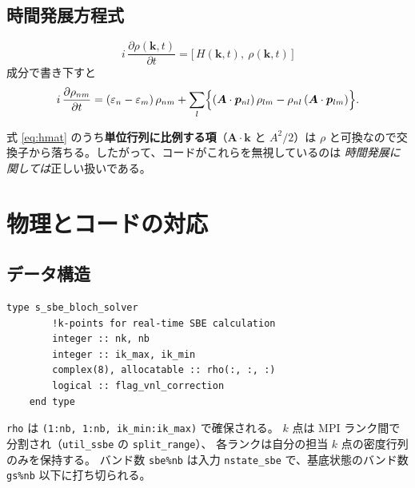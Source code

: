 \documentclass[dvipdfmx,a4paper,11pt]{jsarticle}
\newcommand{\file}[1]{\texttt{#1}}
\newcommand{\vk}{\bm{k}}
\newcommand{\vA}{\bm{A}}
\newcommand{\vp}{\bm{p}}
\newcommand{\eps}{\varepsilon}
\begin{document}
\subsection{時間発展方程式}

\begin{equation}
  i\,\frac{\partial \rho(\vk,t)}{\partial t} = \bigl[\, H(\vk,t),\ \rho(\vk,t) \,\bigr]
  \label{eq:vn}
\end{equation}
%
成分で書き下すと
%
\begin{equation}
  i\,\frac{\partial \rho_{nm}}{\partial t}
  = (\eps_n - \eps_m)\,\rho_{nm}
  + \sum_{l}\Bigl\{ (\vA\cdot\vp_{nl})\,\rho_{lm} - \rho_{nl}\,(\vA\cdot\vp_{lm}) \Bigr\}.
  \label{eq:vncomp}
\end{equation}

式 \eqref{eq:hmat} のうち\textbf{単位行列に比例する項}（$\vA\cdot\vk$ と $A^2/2$）は
$\rho$ と可換なので交換子から落ちる。したがって、コードがこれらを無視しているのは
\emph{時間発展に関しては}正しい扱いである。

\section{物理とコードの対応}

\subsection{データ構造}

\begin{lstlisting}[firstnumber=10,caption={派生型 \texttt{s\_sbe\_bloch\_solver}}]
    type s_sbe_bloch_solver
        !k-points for real-time SBE calculation
        integer :: nk, nb
        integer :: ik_max, ik_min
        complex(8), allocatable :: rho(:, :, :)
        logical :: flag_vnl_correction
    end type
\end{lstlisting}

\file{rho} は \verb|(1:nb, 1:nb, ik_min:ik_max)| で確保される。
$k$ 点は MPI ランク間で分割され（\file{util\_ssbe} の \verb|split_range|）、
各ランクは自分の担当 $k$ 点の密度行列のみを保持する。
バンド数 \file{sbe\%nb} は入力 \file{nstate\_sbe} で、基底状態のバンド数
\file{gs\%nb} 以下に打ち切られる。

\end{document}
